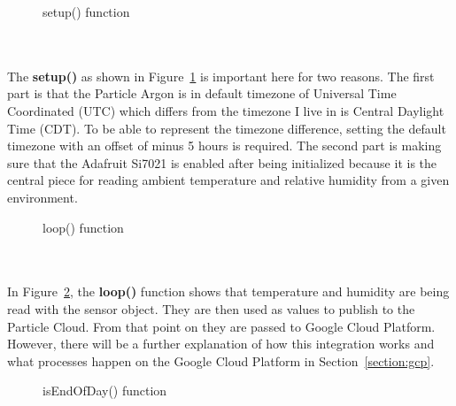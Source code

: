 \documentclass{article}
\begin{document}
\begin{minipage}[c]{\textwidth}
	\begin{figure}[H]
		
		\caption{setup() function}
		\label{fig:setup}
	\end{figure}
\end{minipage}\ \\\\

The \textbf{setup()} as shown in Figure~\ref{fig:setup} is important here for two reasons. The first part is that the Particle Argon is in default timezone of Universal Time Coordinated (UTC) which differs from the timezone I live in is Central Daylight Time (CDT). To be able to represent the timezone difference, setting the default timezone with an offset of minus 5 hours is required. The second part is making sure that the Adafruit Si7021 is enabled after being initialized because it is the central piece for reading ambient temperature and relative humidity from a given environment.

\begin{minipage}[c]{\textwidth}
	\begin{figure}[H]
		
		\caption{loop() function}
		\label{fig:loop}
	\end{figure}
\end{minipage}\ \\\\

In Figure~\ref{fig:loop}, the \textbf{loop()} function shows that temperature and humidity are being read with the sensor object. They are then used as values to publish to the Particle Cloud. From that point on they are passed to Google Cloud Platform. However, there will be a further explanation of how this integration works and what processes happen on the Google Cloud Platform in Section~\ref{section:gcp}.

\begin{minipage}[c]{\textwidth}
	\begin{figure}[H]
		
		\caption{isEndOfDay() function}
		\label{fig:endofday}
	\end{figure}
\end{minipage}\ \\\\
\end{document}
